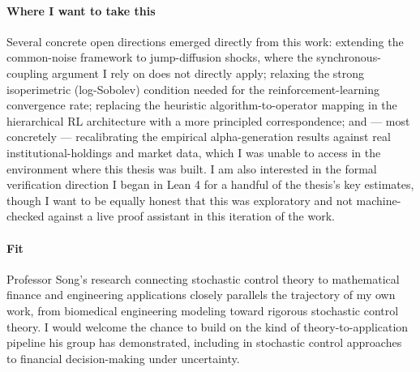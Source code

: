 \documentclass[11pt]{article}
\begin{document}
\paragraph{Where I want to take this} Several concrete open directions emerged directly from this
work: extending the common-noise framework to jump-diffusion shocks, where the
synchronous-coupling argument I rely on does not directly apply; relaxing the strong isoperimetric
(log-Sobolev) condition needed for the reinforcement-learning convergence rate; replacing the
heuristic algorithm-to-operator mapping in the hierarchical RL architecture with a more principled
correspondence; and --- most concretely --- recalibrating the empirical alpha-generation results
against real institutional-holdings and market data, which I was unable to access in the
environment where this thesis was built. I am also interested in the formal verification direction
I began in Lean 4 for a handful of the thesis's key estimates, though I want to be equally honest
that this was exploratory and not machine-checked against a live proof assistant in this iteration
of the work.

\paragraph{Fit} Professor Song's research connecting stochastic control theory to mathematical
finance and engineering applications closely parallels the trajectory of my own work, from
biomedical engineering modeling toward rigorous stochastic control theory. I would welcome the
chance to build on the kind of theory-to-application pipeline his group has demonstrated,
including in stochastic control approaches to financial decision-making under uncertainty.
\end{document}
